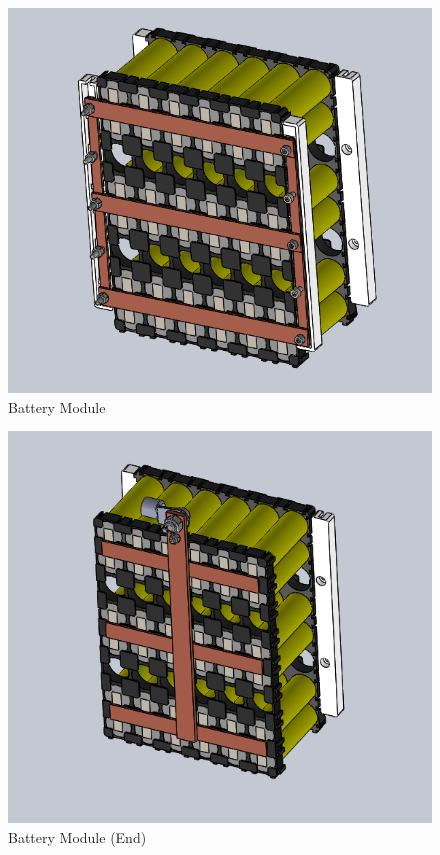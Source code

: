 \documentclass[10pt]{article}
\begin{document}
\begin{figure}[H]
  \centering
  \includegraphics[width=\textwidth]{figures/battery_module.png}
  \caption{Battery Module}
  \label{fig:battery-module}
\end{figure}

\begin{figure}[H]
  \centering
  \includegraphics[width=\textwidth]{figures/battery_module_end.png}
  \caption{Battery Module (End)}
  \label{fig:battery-module-end}
\end{figure}
\end{document}
